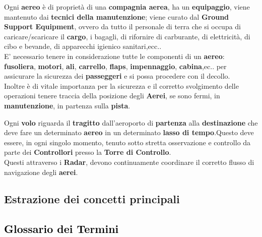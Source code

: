 \textsf{\small Ogni \textbf{aereo} è di proprietà di una \textbf{compagnia aerea}, ha un \textbf{equipaggio}, viene mantenuto dai \textbf{tecnici della manutenzione}; viene curato dal \textbf{Ground Support Equipment}, ovvero da tutto il personale di terra che si occupa di caricare/scaricare il \textbf{cargo}, i bagagli, di rifornire di carburante, di elettricità, di cibo e bevande, di apparecchi igienico sanitari,ecc.. }\\

\textsf{\small E' necessario tenere in considerazione tutte le componenti di un \textbf{aereo}: \textbf{fusoliera}, \textbf{motori}, \textbf{ali}, \textbf{carrello}, \textbf{flaps}, \textbf{impennaggio}, \textbf{cabina},ec.. per assicurare la sicurezza dei \textbf{passeggeri} e si possa procedere con il decollo.}\\

\textsf{\small Inoltre è di vitale importanza per la sicurezza e il corretto svolgimento delle operazioni tenere traccia della posizione degli \textbf{Aerei}, se sono fermi, in \textbf{manutenzione}, in partenza sulla \textbf{pista}.}\break

\textsf{\small Ogni \textbf{volo} riguarda il \textbf{tragitto} dall'aeroporto di \textbf{partenza} alla \textbf{destinazione} che deve fare un determinato \textbf{aereo} in un determinato \textbf{lasso di tempo}.Questo deve essere, in ogni singolo momento, tenuto sotto stretta osservazione e controllo da parte dei \textbf{Controllori} presso la \textbf{Torre di Controllo}.}\\

\textsf{\small Questi attraverso i \textbf{Radar}, devono continuamente coordinare il corretto flusso di navigazione degli \textbf{aerei}.}\\

\newpage

\subsection{Estrazione dei concetti principali}

\subsection{\textcolor{black}{Glossario dei Termini}}


